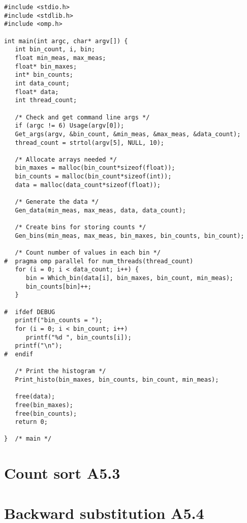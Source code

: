 \documentclass[a4paper,11pt,twoside]{article}
\begin{document}
\begin{verbatim}
#include <stdio.h>
#include <stdlib.h>
#include <omp.h>

int main(int argc, char* argv[]) {
   int bin_count, i, bin;
   float min_meas, max_meas;
   float* bin_maxes;
   int* bin_counts;
   int data_count;
   float* data;
   int thread_count;

   /* Check and get command line args */
   if (argc != 6) Usage(argv[0]); 
   Get_args(argv, &bin_count, &min_meas, &max_meas, &data_count);
   thread_count = strtol(argv[5], NULL, 10);

   /* Allocate arrays needed */
   bin_maxes = malloc(bin_count*sizeof(float));
   bin_counts = malloc(bin_count*sizeof(int));
   data = malloc(data_count*sizeof(float));

   /* Generate the data */
   Gen_data(min_meas, max_meas, data, data_count);

   /* Create bins for storing counts */
   Gen_bins(min_meas, max_meas, bin_maxes, bin_counts, bin_count);

   /* Count number of values in each bin */
#  pragma omp parallel for num_threads(thread_count)
   for (i = 0; i < data_count; i++) {
      bin = Which_bin(data[i], bin_maxes, bin_count, min_meas);
      bin_counts[bin]++;
   }

#  ifdef DEBUG
   printf("bin_counts = ");
   for (i = 0; i < bin_count; i++)
      printf("%d ", bin_counts[i]);
   printf("\n");
#  endif

   /* Print the histogram */
   Print_histo(bin_maxes, bin_counts, bin_count, min_meas);

   free(data);
   free(bin_maxes);
   free(bin_counts);
   return 0;

}  /* main */
\end{verbatim}

\section{Count sort A5.3}



\section{Backward substitution A5.4}

\appendix
\end{document}
